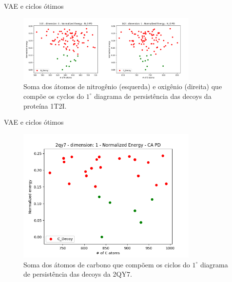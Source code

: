 \documentclass[10pt]{beamer}
\begin{document}
\begin{frame}{VAE e ciclos ótimos}
    \begin{figure}
    \centering
    \includegraphics[width=0.8\textwidth]{../images/relatorio/NOcyc.png}
    \caption{Soma dos átomos de nitrogênio (esquerda) e oxigênio (direita) que compõe os cyclos do 
    $1^\circ$ diagrama de persistência das decoys da proteína 1T2I.}
    \end{figure}
\end{frame}

\begin{frame}{VAE e ciclos ótimos}
    \begin{figure}
    \centering
    \includegraphics[width=0.8\textwidth]{../images/relatorio/cyc2qy7.png}
    \caption{Soma dos átomos de carbono que compõem os ciclos do
            $1^\circ$ diagrama de persistência das decoys da 2QY7.}
    \end{figure}
\end{frame}
\end{document}
